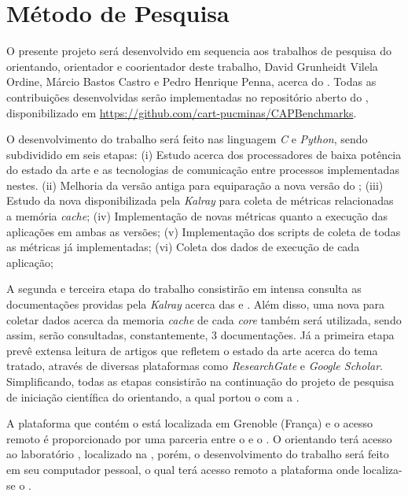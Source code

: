 \documentclass[
    12pt,               %
    openright,          %
    twoside,            %
    a4paper,            %
    english,            %
    brazil,             %
    ]{abntex2}
\begin{document}
\chapter{Método de Pesquisa}
\label{cap:metodo-pesquisa}

O presente projeto será desenvolvido em sequencia aos trabalhos de pesquisa do orientando, orientador e coorientador deste trabalho, David Grunheidt Vilela Ordine, Márcio Bastos Castro e Pedro Henrique Penna, acerca do \mppa. Todas as contribuições desenvolvidas serão implementadas no repositório aberto do \capb, disponibilizado em \url{https://github.com/cart-pucminas/CAPBenchmarks}.
    
O desenvolvimento do trabalho será feito nas linguagem \textit{C} e \textit{Python}, sendo subdividido em seis etapas:
(i) Estudo acerca dos processadores \manycore de baixa potência do estado da arte e as tecnologias de comunicação entre processos implementadas nestes.
(ii) Melhoria da versão antiga para equiparação a nova versão do \capb; 
(iii) Estudo da nova \api disponibilizada pela \textit{Kalray} para coleta de métricas relacionadas a memória \textit{cache};
(iv) Implementação de novas métricas quanto a execução das aplicações em ambas as versões; 
(v) Implementação dos scripts de coleta de todas as métricas já implementadas; 
(vi) Coleta dos dados de execução de cada aplicação;

A segunda e terceira etapa do trabalho consistirão em intensa consulta as documentações providas pela \textit{Kalray} acerca das \apis \async e \ipc. Além disso, uma nova \api para coletar dados acerca da memoria \textit{cache} de cada \textit{core} também será utilizada, sendo assim, serão consultadas, constantemente, 3 documentações. Já a primeira etapa prevê extensa leitura de artigos que refletem o estado da arte acerca do tema tratado, através de diversas plataformas como \textit{ResearchGate} e \textit{Google Scholar}. Simplificando, todas as etapas consistirão na continuação do projeto de pesquisa de iniciação científica do orientando, a qual portou o \capb com a \api \async.

A plataforma que contém o \mppa está localizada em Grenoble (França) e o acesso
remoto é proporcionado por uma parceria entre o \lapesd e o \lig. O orientando terá acesso ao laboratório \lapesd, localizado na \ufsc, porém, o desenvolvimento do trabalho será feito em seu computador pessoal, o qual terá acesso remoto a plataforma onde localiza-se o \mppa. 

\end{document}
